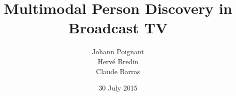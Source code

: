 \documentclass{acm_proc_article-me}
\begin{document}
%

\title{Multimodal Person Discovery in Broadcast TV}
%
%
%
%
%


\author{
%
%
\alignauthor
Johann Poignant\\
\alignauthor
Herv\'e Bredin\\
\alignauthor
Claude Barras\\
}
\date{30 July 2015}
\end{document}
